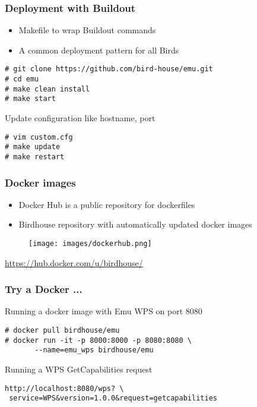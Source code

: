 \documentclass{beamer}
\begin{document}
\begin{frame}[fragile]
  \frametitle<presentation>{Deployment with Buildout}
  \begin{itemize}
    \item Makefile to wrap Buildout commands
    \item A common deployment pattern for all Birds
  \end{itemize}
    \begin{verbatim}
# git clone https://github.com/bird-house/emu.git
# cd emu
# make clean install
# make start
    \end{verbatim}
  Update configuration like hostname, port
    \begin{verbatim}
# vim custom.cfg
# make update
# make restart
    \end{verbatim}
\end{frame}

\begin{frame}
\frametitle<presentation>{Docker images}

\begin{itemize}
  \item Docker Hub is a public repository for dockerfiles
  \item Birdhouse repository with automatically updated docker images
\end{itemize}

  \begin{figure}[ht]
   \centering
   \texttt{[image: images/dockerhub.png]}
  \end{figure}

\vspace{0.2cm}
\centering
\footnotesize{\url{https://hub.docker.com/u/birdhouse/}}

\end{frame}

\begin{frame}
  \frametitle<presentation>{Try a Docker ...}
  Running a docker image with Emu WPS on port 8080
    \begin{verbatim}
# docker pull birdhouse/emu
# docker run -it -p 8000:8000 -p 8080:8080 \
       --name=emu_wps birdhouse/emu
    \end{verbatim}
  Running a WPS GetCapabilities request
    \begin{verbatim}
http://localhost:8080/wps? \
 service=WPS&version=1.0.0&request=getcapabilities
    \end{verbatim}
\end{frame}
\end{document}
